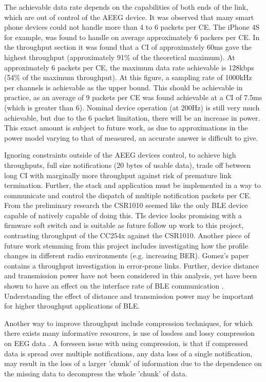 \documentclass[]{article}
\begin{document}
The achievable data rate depends on the capabilities of both ends of the link, which are out of control of the \ac{AEEG} device. It was observed that many smart phone devices could not handle more than 4 to 6 packets per \ac{CE}. The iPhone 4S for example, was found to handle on average approximately 6 packers per \ac{CE}. In the throughput section it was found that a \ac{CI} of approximately 60ms gave the highest throughput (approximately 91\% of the theoretical maximum). At approximately 6 packets per \ac{CE}, the maximum data rate achievable is 128kbps (54\% of the maximum throughput). At this figure, a sampling rate of 1000kHz per channels is achievable as the upper bound. This should be achievable in practice, as an average of 9 packets per \ac{CE} was found achievable at a \ac{CI} of 7.5ms (which is greater than 6). Nominal device operation (at 200Hz) is still very much achievable, but due to the 6 packet limitation, there will be an increase in power. This exact amount is subject to future work, as due to approximations in the power model varying to that of measured, an accurate answer is difficult to give.

Ignoring constraints outside of the \ac{AEEG} devices control, to achieve high throughputs, full size notifications (20 bytes of usable data), trade off between long \ac{CI} with marginally more throughput against risk of premature link termination. Further, the stack and application must be implemented in a way to communicate and control the dispatch of multiple notification packets per \ac{CE}. From the preliminary research the CSR1010 seemed like the only \ac{BLE} device capable of natively capable of doing this. \ac{TI}s device looks promising with a firmware soft switch and is suitable as future follow up work to this project, contrasting throughput of the CC254x against the CSR1010. Another piece of future work stemming from this project includes investigating how the profile changes in different radio environments (e.g. increasing \ac{BER}). Gomez's\cite{Gomez2011} paper contains a throughput investigation in error-prone links. Further, device distance and transmission power have not been considered in this analysis, yet have been shown to have an effect on the interface rate of \ac{BLE} communication \cite{Siekkinen2012}. Understanding the effect of distance and transmission power may be important for higher throughput applications of \ac{BLE}.

Another way to improve throughput include compression techniques, for which there exists many informative resources, is use of lossless and lossy compression on \ac{EEG} data \cite{Antoniol1997} \cite{Wongsawat2006}. A foreseen issue with using compression, is that if compressed data is spread over multiple notifications, any data loss of a single notification, may result in the loss of a larger 'chunk' of information due to the dependence on the missing data to decompress the whole 'chunk' of data. 
\end{document}

